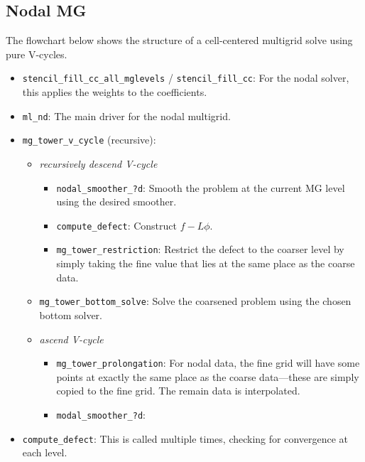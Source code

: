 \subsection{Nodal MG}

The flowchart below shows the structure of a cell-centered multigrid
solve using pure V-cycles.


\begin{itemize}

\item {\tt stencil\_fill\_cc\_all\_mglevels} / {\tt stencil\_fill\_cc}:
  For the nodal solver, this applies the weights to the 
  coefficients. 

\item {\tt ml\_nd}: The main driver for the nodal multigrid.

\item {\tt mg\_tower\_v\_cycle} (recursive):
\begin{itemize}

  \item {\em recursively descend V-cycle}
  \begin{itemize} 
  \item {\tt nodal\_smoother\_?d}: Smooth the 
    problem at the current MG level using the desired smoother.

  \item {\tt compute\_defect}: Construct $f - L\phi$.

  \item {\tt mg\_tower\_restriction}:  Restrict
    the defect to the coarser level by simply taking the fine value that
    lies at the same place as the coarse data.
  \end{itemize}

  \item {\tt mg\_tower\_bottom\_solve}:  Solve the coarsened problem
    using the chosen bottom solver.

  \item {\em ascend V-cycle}

  \begin{itemize}
  \item {\tt mg\_tower\_prolongation}: For nodal data, the fine grid
     will have some points at exactly the same place as the coarse data---these are
     simply copied to the fine grid.  The remain data is interpolated.

  \item {\tt modal\_smoother\_?d}:
  \end{itemize}

\end{itemize}
\item {\tt compute\_defect}: This is called multiple times, checking for
   convergence at each level.


\end{itemize}
